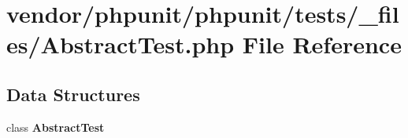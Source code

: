 \section{vendor/phpunit/phpunit/tests/\+\_\+files/\+Abstract\+Test.php File Reference}
\label{_abstract_test_8php}
\subsection*{Data Structures}
\begin{DoxyCompactItemize}
\item 
class {\bf Abstract\+Test}
\end{DoxyCompactItemize}
